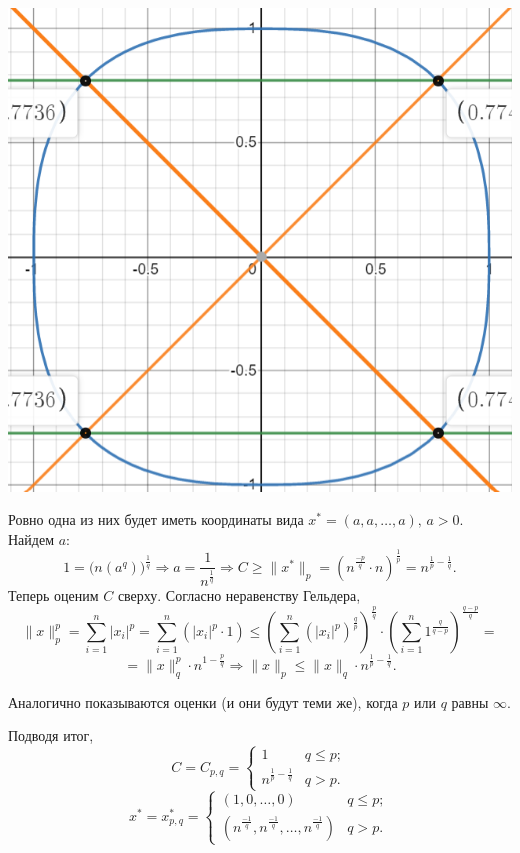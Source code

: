 \documentclass{article}
\begin{document}
\vspace{2mm}
\begin{center}
\includegraphics[scale = 0.8]{p_norms.png}
\end{center}
\vspace{2mm}

Ровно одна из них будет иметь координаты вида $x^* = (a,a,\ldots,a), \, a > 0.$ Найдем $a$:
$$ 1 = \big(n(a^q)\big)^\frac{1}{q} \Rightarrow a = \frac{1}{n^\frac{1}{q}} \Rightarrow C \geqslant \|x^*\|_p = \left(n^{\frac{-p}{q}} \cdot n\right)^{\frac{1}{p}} = n^{\frac{1}{p}-\frac{1}{q}}. $$
Теперь оценим $C$ сверху. Согласно неравенству Гельдера, 
$$ \|x\|_p^p = \sum\limits_{i=1}^n|x_i|^p = \sum\limits_{i=1}^n(|x_i|^p \cdot 1) \leqslant \left(\sum\limits_{i=1}^n(|x_i|^p)^{\frac{q}{p}}\right)^{\frac{p}{q}} \cdot \left(\sum\limits_{i=1}^n 1^{\frac{q}{q-p}}\right)^{\frac{q-p}{q}} = $$
$$ = \|x\|_q^p \cdot n^{1-\frac{p}{q}} \Rightarrow \|x\|_p \leqslant \|x\|_q \cdot n^{\frac{1}{p}-\frac{1}{q}}. $$

Аналогично показываются оценки (и они будут теми же), когда $p$ или $q$ равны $\infty$.

Подводя итог, 
\begin{equation*} C = C_{p,q} = 
	\begin{cases}
		1 & q \leqslant p; \\
		n^{\frac{1}{p}-\frac{1}{q}} & q > p.
	\end{cases}
\end{equation*}
\begin{equation*} x^* = x_{p,q}^* = 
	\begin{cases}
		(1,0,\ldots,0) & q \leqslant p; \\
		\left(n^{\frac{-1}{q}}, n^{\frac{-1}{q}},\ldots, n^{\frac{-1}{q}} \right) & q > p.
	\end{cases}
\end{equation*}
\end{document}
